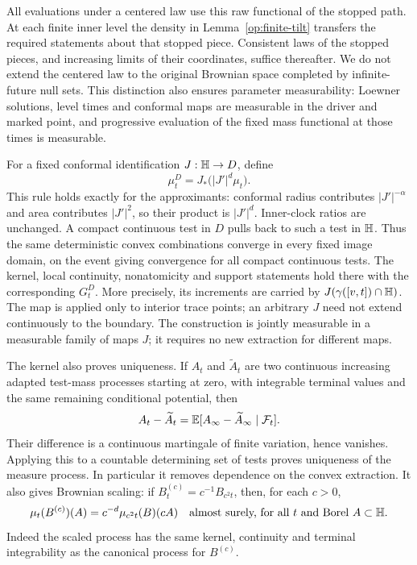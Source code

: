 All evaluations under a centered law use this raw functional of the
stopped path.  At each finite inner level the density in
Lemma~\ref{op:finite-tilt} transfers the required statements about
that stopped piece.  Consistent laws of the stopped pieces, and increasing
limits of their coordinates, suffice thereafter.  We do not extend the
centered law to the original Brownian space completed by infinite-future
null sets.  This distinction also ensures parameter measurability:
Loewner solutions, level times and conformal maps are measurable in the
driver and marked point, and progressive evaluation of the fixed mass
functional at those times is measurable.

For a fixed conformal identification $J:\mathbb H\to D$, define
\begin{equation}
 \mu_t^D=J_*\bigl(|J'|^d\mu_t\bigr).
 \label{mass:conformal}
\end{equation}
This rule holds exactly for the approximants: conformal radius contributes
$|J'|^{-\alpha}$ and area contributes $|J'|^2$, so their product is
$|J'|^d$.  Inner-clock ratios are unchanged.
A compact continuous test in $D$ pulls back to such a test in $\mathbb H$.
Thus the same deterministic convex combinations converge in every fixed
image domain, on the event giving convergence for all compact continuous
tests.  The kernel, local continuity, nonatomicity and support statements
hold there with the corresponding $G_t^D$. More precisely, its increments
are carried by $J(\gamma([v,t])\cap\mathbb H)$. The map is applied only to
interior trace points; an arbitrary $J$ need not extend continuously
to the boundary.
The construction is jointly measurable in a measurable family of maps
$J$; it requires no new extraction for different maps.

The kernel also proves uniqueness.  If $A_t$ and $\widetilde A_t$ are
two continuous increasing adapted test-mass processes starting at zero,
with integrable terminal values and the same remaining conditional
potential, then
\[
 A_t-\widetilde A_t
   =\mathbb E[A_\infty-\widetilde A_\infty\mid\mathcal F_t].
\]
Their difference is a continuous martingale of finite variation, hence
vanishes.  Applying this to a countable determining set of tests proves
uniqueness of the measure process.  In particular it removes dependence
on the convex extraction.  It also gives Brownian scaling: if
$B^{(c)}_t=c^{-1}B_{c^2t}$, then, for each $c>0$,
\begin{equation}
 \mu_t(B^{(c)})(A)=c^{-d}\mu_{c^2t}(B)(cA)
 \quad\text{almost surely, for all }t\text{ and Borel }A\subset\mathbb H.
 \label{mass:scaling}
\end{equation}
Indeed the scaled process has the same kernel, continuity and terminal
integrability as the canonical process for $B^{(c)}$.

